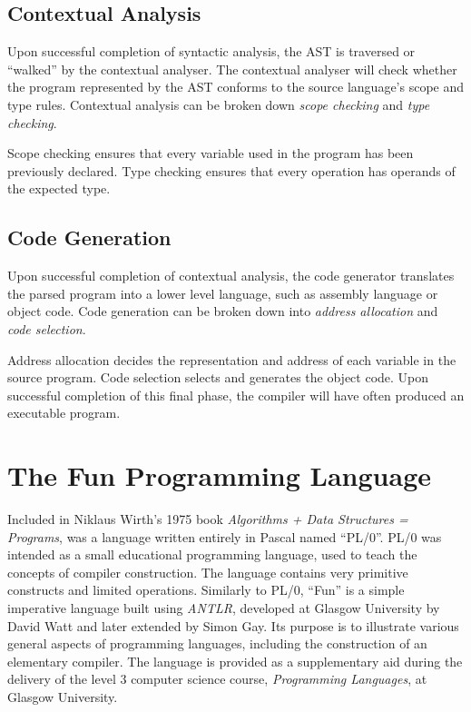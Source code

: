\documentclass{l4proj}
\begin{document}
\subsection{Contextual Analysis}
Upon successful completion of syntactic analysis, the AST is traversed or ``walked'' by the contextual analyser. The contextual analyser will check whether the program represented by the AST conforms to the source language's scope and type rules. Contextual analysis can be broken down \textit{scope checking} and \textit{type checking}.

Scope checking ensures that every variable used in the program has been previously declared. Type checking ensures that every operation has operands of the expected type.

\subsection{Code Generation}
Upon successful completion of contextual analysis, the code generator translates the parsed program into a lower level language, such as assembly language or object code. Code generation can be broken down into \textit{address allocation} and \textit{code selection}.

Address allocation decides the representation and address of each variable in the source program. Code selection selects and generates the object code. Upon successful completion of this final phase, the compiler will have often produced an executable program.

\section{The Fun Programming Language}
Included in Niklaus Wirth's 1975 book {\it Algorithms + Data Structures = Programs}, was a language written entirely in Pascal named ``PL/0''. PL/0 was intended as a small educational programming language, used to teach the concepts of compiler construction. The language contains very primitive constructs and limited operations. Similarly to PL/0, ``Fun'' is a simple imperative language built using \textit {ANTLR}, developed at Glasgow University by David Watt and later extended by Simon Gay. Its purpose is to illustrate various general aspects of programming languages, including the construction of an elementary compiler. The language is provided as a supplementary aid during the delivery of the level 3 computer science course, {\it Programming Languages}, at Glasgow University.
\end{document}
